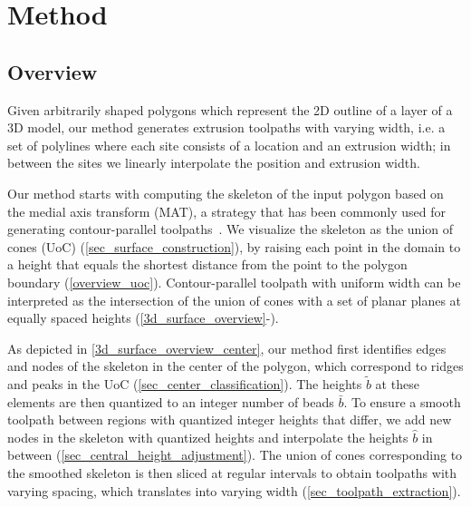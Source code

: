 \section{Method}
\subsection{Overview}

Given arbitrarily shaped polygons which represent the 2D outline of a layer of a 3D model, our method generates extrusion toolpaths with varying width, i.e. a set of polylines where each site consists of a location and an extrusion width;
in between the sites we linearly interpolate the position and extrusion width.

Our method starts with computing the skeleton of the input polygon based on the medial axis transform (MAT), a strategy that has been commonly used for generating contour-parallel toolpaths~\cite{eiamsa2003toward}. 
We visualize the skeleton as the union of cones (UoC) (\cref{sec_surface_construction}), by raising each point in the domain to a height that equals the shortest distance from the point to the polygon boundary (\cref{overview_uoc}).
Contour-parallel toolpath with uniform width can be interpreted as the intersection of the union of cones with a set of planar planes at equally spaced heights (\cref{3d_surface_overview}-).

As depicted in \cref{3d_surface_overview_center}, our method first identifies edges and nodes of the skeleton in the center of the polygon, which correspond to ridges and peaks in the UoC  (\cref{sec_center_classification}).
The heights $\tilde{b}$ at these elements are then quantized to an integer number of beads $\bar{b}$.
To ensure a smooth toolpath between regions with quantized integer heights that differ, we add new nodes in the skeleton with quantized heights and interpolate the heights $\hat{b}$ in between (\cref{sec_central_height_adjustment}).
The union of cones corresponding to the smoothed skeleton is then sliced at regular intervals to obtain toolpaths with varying spacing, which translates into varying width (\cref{sec_toolpath_extraction}).


